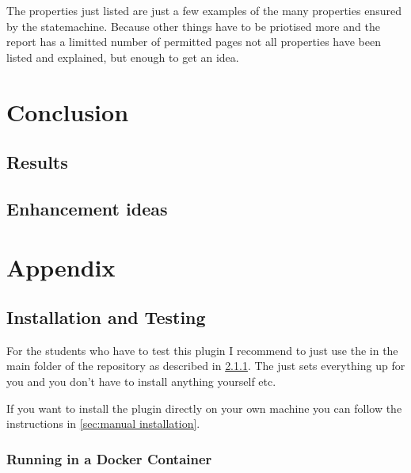 \documentclass{report}
\begin{document}
The properties just listed are just a few examples of the many properties ensured by the statemachine. Because other things have to be priotised more and the report has a limitted number of permitted pages not all properties have been listed and explained, but enough to get an idea.


\chapter{Conclusion}

\section{Results}

\section{Enhancement ideas}

\clearpage
\chapter{Appendix}

\section{Installation and Testing}

For the students who have to test this plugin I recommend to just use the  in the main folder of the repository as described in \ref{sec:running in a docker image}. The  just sets everything up for you and you don't have to install anything yourself etc.

If you want to install the plugin directly on your own machine you can follow the instructions in \ref{sec:manual installation}.

\subsection{Running in a Docker Container}
\label{sec:running in a docker image}
\end{document}
